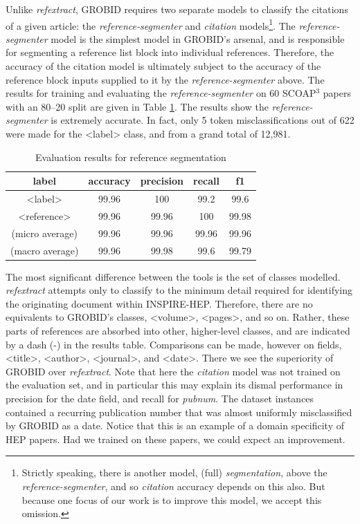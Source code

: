 Unlike \emph{refextract}, GROBID requires two separate models to classify the citations of a given article: the \emph{reference-segmenter} and \emph{citation} models\footnote{Strictly speaking, there is another model, (full) \emph{segmentation}, above the \emph{reference-segmenter}, and so \emph{citation} accuracy depends on this also. But because one focus of our work is to improve this model, we accept this omission.}. The \emph{reference-segmenter} model is the simplest model in GROBID's arsenal, and is responsible for segmenting a reference list block into individual references. Therefore, the accuracy of the citation model is ultimately subject to the accuracy of the reference block inputs supplied to it by the \emph{reference-segmenter} above. The results for training and evaluating the \emph{reference-segmenter} on 60 SCOAP$^3$ papers with an 80--20 split are given in Table \ref{table:referencesegmenterresults}. The results show the \emph{reference-segmenter} is extremely accurate. In fact, only 5 token misclassifications out of 622 were made for the <label> class, and from a grand total of 12,981.

\label{subsec:refextract}
\begin{table}[h]
\begin{center}
\begin{tabular}{|c|cccc|}
\hline
label           & accuracy  & precision  & recall   & f1 \\
\hline
<label>         & 99.96     & 100        & 99.2     & 99.6\\
<reference>     & 99.96     & 99.96      & 100      & 99.98\\
\hline
(micro average) & 99.96     & 99.96      & 99.96    & 99.96  \\
(macro average) & 99.96     & 99.98      & 99.6     & 99.79  \\
\hline
\end{tabular}
\caption[Evaluation results for reference segmentation]{Evaluation results for reference segmentation}
\label{table:referencesegmenterresults}
\end{center}
\end{table}

The most significant difference between the tools is the set of classes modelled. \emph{refextract} attempts only to classify to the minimum detail required for identifying the originating document within INSPIRE-HEP. Therefore, there are no equivalents to GROBID's classes, <volume>, <pages>, and so on. Rather, these parts of references are absorbed into other, higher-level classes, and are indicated by a dash (-) in the results table. Comparisons can be made, however on fields, <title>, <author>, <journal>, and <date>. There we see the superiority of GROBID over \emph{refextract}. Note that here the \emph{citation} model was not trained on the evaluation set, and in particular this may explain its dismal performance in precision for the date field, and recall for \emph{pubnum}. The dataset instances contained a recurring publication number that was almost uniformly misclassified by GROBID as a date. Notice that this is an example of a domain specificity of HEP papers. Had we trained on these papers, we could expect an improvement.

